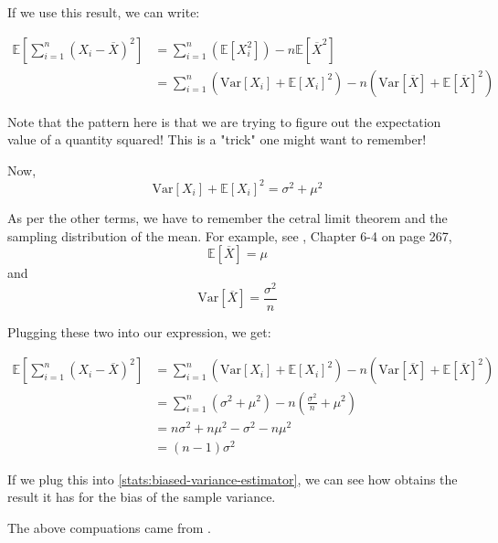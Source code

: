 If we use this result, we can write:

\begin{align*}
\mathbb{E} \left[ \sum_{i=1}^{n} \left( X_i - \overline{X} \right)^2 \right]
    &= \sum_{i=1}^{n} \left( \mathbb{E}\left[ X_{i}^2 \right] \right) - n \mathbb{E}\left[\overline{X}^2 \right] \\
&= \sum_{i=1}^{n} \left( \text{Var}\left[X_i\right] + \mathbb{E}\left[ X_i \right]^2 \right)
    - n \left( \text{Var}\left[ \overline{X} \right] + \mathbb{E}\left[ \overline{X} \right]^2 \right)
\end{align*}

Note that the pattern here is that we are trying to figure out the expectation value of a quantity squared!
This is a "trick" one might want to remember!

Now,
$$
\text{Var}\left[X_i\right] + \mathbb{E}\left[ X_i \right]^2
    = \sigma^2 + \mu^2
$$

As per the other terms,
we have to remember the cetral limit theorem and the sampling distribution of the mean.
For example, see \cite{elementary-stats}, Chapter 6-4 on page 267,
$$
\mathbb{E}\left[\overline{X}\right] = \mu
$$
and
$$
\text{Var}\left[\overline{X}\right] = \frac{\sigma^2}{n}
$$

Plugging these two into our expression, we get:

\begin{align*}
\mathbb{E} \left[ \sum_{i=1}^{n} \left( X_i - \overline{X} \right)^2 \right]
    &= \sum_{i=1}^{n} \left( \text{Var}\left[X_i\right] + \mathbb{E}\left[ X_i \right]^2 \right)
        - n \left( \text{Var}\left[ \overline{X} \right] + \mathbb{E}\left[ \overline{X} \right]^2 \right) \\
&= \sum_{i=1}^{n} \left( \sigma^2 + \mu^2 \right) - n\left( \frac{\sigma^2}{n} + \mu^2 \right) \\
&= n\sigma^2 + n\mu^2 - \sigma^2 - n\mu^2 \\
&= \left(n-1\right) \sigma^2
\end{align*}

If we plug this into \ref{stats:biased-variance-estimator}, we can see how \cite{Goodfellow-et-al-2016}
obtains the result it has for the bias of the sample variance.

The above compuations came from \cite{stat-theory}.
